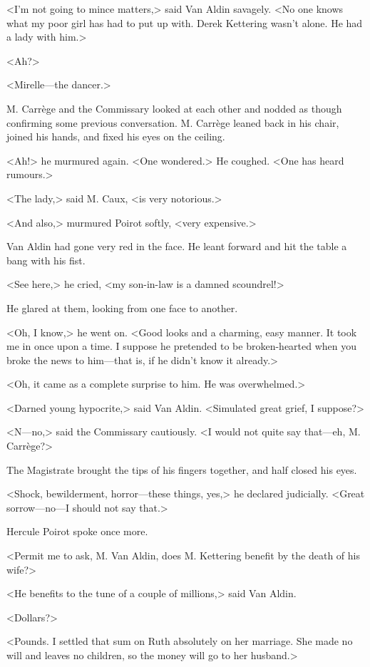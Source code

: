 <I'm not going to mince matters,> said Van Aldin savagely. <No one knows what my poor girl has had to put up with. Derek Kettering wasn't alone. He had a lady with him.>

<Ah?>

<Mirelle—the dancer.>

M. Carrège and the Commissary looked at each other and nodded as though confirming some previous conversation. M. Carrège leaned back in his chair, joined his hands, and fixed his eyes on the ceiling.

<Ah!> he murmured again. <One wondered.> He coughed. <One has heard rumours.>

<The lady,> said M. Caux, <is very notorious.>

<And also,> murmured Poirot softly, <very expensive.>

Van Aldin had gone very red in the face. He leant forward and hit the table a bang with his fist.

<See here,> he cried, <my son-in-law is a damned scoundrel!>

He glared at them, looking from one face to another.

<Oh, I know,> he went on. <Good looks and a charming, easy manner. It took me in once upon a time. I suppose he pretended to be broken-hearted when you broke the news to him—that is, if he didn't know it already.>

<Oh, it came as a complete surprise to him. He was overwhelmed.>

<Darned young hypocrite,> said Van Aldin. <Simulated great grief, I suppose?>

<N—no,> said the Commissary cautiously. <I would not quite say that—eh, M. Carrège?>

The Magistrate brought the tips of his fingers together, and half closed his eyes.

<Shock, bewilderment, horror—these things, yes,> he declared judicially. <Great sorrow—no—I should not say that.>

Hercule Poirot spoke once more.

<Permit me to ask, M. Van Aldin, does M. Kettering benefit by the death of his wife?>

<He benefits to the tune of a couple of millions,> said Van Aldin.

<Dollars?>

<Pounds. I settled that sum on Ruth absolutely on her marriage. She made no will and leaves no children, so the money will go to her husband.>

